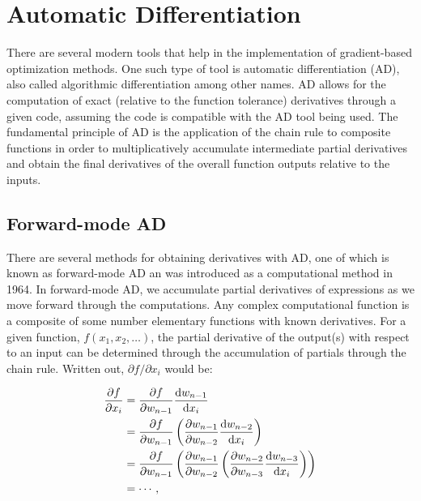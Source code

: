 \section{Automatic Differentiation}
\label{sec:ad}

There are several modern tools that help in the implementation of gradient-based optimization methods.
%
One such type of tool is automatic differentiation (AD), also called algorithmic differentiation among other names.
%
AD allows for the computation of exact (relative to the function tolerance) derivatives through a given code, assuming the code is compatible with the AD tool being used.
%
The fundamental principle of AD is the application of the chain rule to composite functions in order to multiplicatively accumulate intermediate partial derivatives and obtain the final derivatives of the overall function outputs relative to the inputs.

\subsection{Forward-mode AD}

There are several methods for obtaining derivatives with AD, one of which is known as forward-mode AD an was introduced as a computational method in 1964.
%
In forward-mode AD, we accumulate partial derivatives of expressions as we move forward through the computations.
%
Any complex computational function is a composite of some number elementary functions with known derivatives.
%
For a given function, \(f(x_1,x_2,\ldots)\), the partial derivative of the output(s) with respect to an input can be determined through the accumulation of partials through the chain rule.
%
Written out, \(\partial f / \partial x_i\) would be:

\begin{equation}
\begin{aligned}
    \frac{\partial f}{\partial x_i} &= \frac{\partial f}{\partial w_{n-1}} \frac{\mathrm{d} w_{n-1}}{\mathrm{d} x_i} \\
                &= \frac{\partial f}{\partial w_{n-1}} \left(\frac{\partial w_{n-1}}{\partial w_{n-2}} \frac{\mathrm{d} w_{n-2}}{\mathrm{d} x_i} \right) \\
                &= \frac{\partial f}{\partial w_{n-1}} \left(\frac{\partial w_{n-1}}{\partial w_{n-2}} \left(\frac{\partial w_{n-2}}{\partial w_{n-3}} \frac{\mathrm{d} w_{n-3}}{\mathrm{d} x_i} \right)\right) \\
                &= \cdots,
\end{aligned}
\end{equation}

